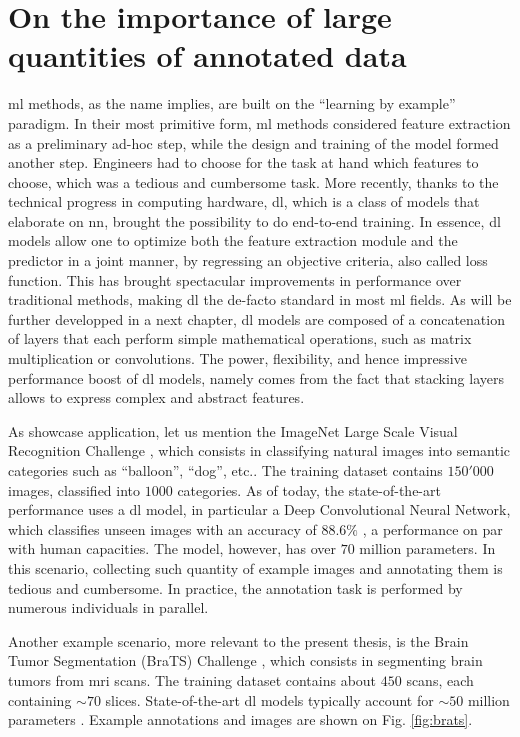 \section{On the importance of large quantities of annotated data}
\Gls{ml} methods, as the name implies, are built on the ``learning by example'' paradigm.
In their most primitive form, \gls{ml} methods considered feature extraction as a preliminary ad-hoc step, while the design and training of the model formed another step.
Engineers had to choose for the task at hand which features to choose, which was a tedious and cumbersome task.
More recently, thanks to the technical progress in computing hardware, \gls{dl}, which is a class of models that elaborate on \gls{nn}, brought the possibility to do end-to-end training.
In essence, \gls{dl} models allow one to optimize both the feature extraction module and the predictor in a joint manner, by regressing an objective criteria, also called loss function.
This has brought spectacular improvements in performance over traditional methods, making \gls{dl} the de-facto standard in most \gls{ml} fields.
As will be further developped in a next chapter, \gls{dl} models are composed of a concatenation of layers that each perform simple mathematical operations, such as matrix multiplication or convolutions.
The power, flexibility, and hence impressive performance boost of \gls{dl} models, namely comes from the fact that stacking layers allows to express complex and abstract features.

As showcase application, let us mention the ImageNet Large Scale Visual Recognition Challenge \cite{ILSVRC15}, which consists in classifying natural images into semantic categories such as ``balloon'', ``dog'', etc..
The training dataset contains $150'000$ images, classified into $1000$ categories.
As of today, the state-of-the-art performance uses a \gls{dl} model, in particular a Deep Convolutional Neural Network, which classifies unseen images with an accuracy of $88.6\%$ \cite{tan19}, a performance on par with human capacities.
The model, however, has over $70$ million parameters.
In this scenario, collecting such quantity of example images and annotating them is tedious and cumbersome.
In practice, the annotation task is performed by numerous individuals in parallel.

Another example scenario, more relevant to the present thesis, is the Brain Tumor Segmentation (BraTS) Challenge \cite{menze15}, which consists in segmenting brain tumors from \gls{mri} scans.
The training dataset contains about $450$ scans, each containing $\sim 70$ slices.
State-of-the-art \gls{dl} models typically account for $\sim 50$ million parameters \cite{chen19}.
Example annotations and images are shown on Fig. \ref{fig:brats}.

